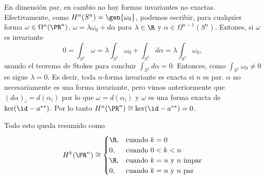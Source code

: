 \documentclass[12pt]{article}
\begin{document}
En dimensión par, en cambio no hay formas invariantes no exactas. Efectivamente, como \(
H^n(S^n) = \gen{\omega_0} \), podemos escribir, para cualquier forma \( \omega \in
\Omega^n(\PR^n) \), \( \omega = \lambda \omega_0 + d\alpha \) para  \( \lambda \in \R \) y
\( \alpha \in \Omega^{n-1}(S^n) \). Entones, si \( \omega \) es invariante
\begin{equation*}
	0 = \int_{S^1} \omega = \lambda \int_{S^1} \omega_0 + \int_{S^1} d\alpha = \lambda
	\int_{S^1} \omega_0,
\end{equation*}
usando el teorema de Stokes para concluir \( \int_{S^1} d\alpha = 0 \). Entonces, como	\(
\int_{S^1} \omega_0 \neq 0 \) se sigue \( \lambda = 0 \). Es decir, toda \( n \)-forma
invariante es exacta si \( n \) es par. \( \alpha \) no necesariamente es una forma
invariante, pero vimos anteriormente que \( (d\alpha)_i = d(\alpha_i) \) por lo que \(
\omega = d(\alpha_i) \) y \( \omega \) es una forma exacta de \( \ker(\id - a^{\ast
\ast}) \). Por lo tanto \( H^n(\PR^n) \cong \ker(\id - a^{\ast \ast}) = 0 \). 

Todo esto queda resumido como
\begin{equation*}
	H^k(\PR^n) \cong 
	\begin{cases}
		\R, & \text{cuando } k = 0 \\
		0, & \text{cuando } 0 < k < n \\
		\R, & \text{cuando } k = n \text{ y } n \text{ impar} \\
		0, & \text{cuando } k = n \text{ y } n \text{ par}
	\end{cases}
\end{equation*}
\end{document}
